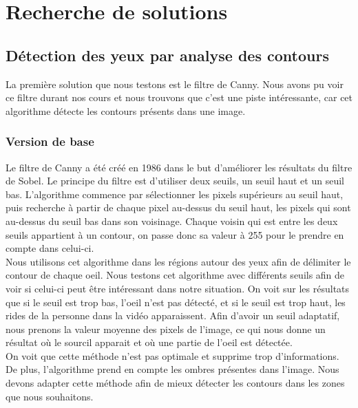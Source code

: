 \section{Recherche de solutions}

\subsection{Détection des yeux par analyse des contours}
La première solution que nous testons est le filtre de Canny. Nous avons pu voir ce filtre durant
nos cours et nous trouvons que c'est une piste intéressante, car cet algorithme détecte les contours
présents dans une image.

\subsubsection{Version de base}
Le filtre de Canny a été créé en 1986 dans le but d'améliorer les résultats du filtre de Sobel.
Le principe du filtre est d'utiliser deux seuils, un seuil haut et un seuil bas. L'algorithme
commence par sélectionner les pixels supérieurs au seuil haut, puis recherche à partir de chaque
pixel au-dessus du seuil haut, les pixels qui sont au-dessus du seuil bas dans son voisinage. 
Chaque voisin qui est entre les deux seuils appartient à un contour, on passe donc sa valeur à
255 pour le prendre en compte dans celui-ci.\\ 

Nous utilisons cet algorithme dans les régions autour des yeux afin de délimiter le contour
de chaque oeil. Nous testons cet algorithme avec différents seuils afin de voir si celui-ci
peut être intéressant dans notre situation. On voit sur les résultats que si le seuil est trop
bas, l'oeil n'est pas détecté, et si le seuil est trop haut, les rides de la personne dans la vidéo
apparaissent. Afin d'avoir un seuil adaptatif, nous prenons la valeur moyenne des pixels de l'image, ce
qui nous donne un résultat où le sourcil apparait et où une partie de l'oeil est détectée.\\


On voit que cette méthode n'est pas optimale et supprime trop d'informations. De plus,
l'algorithme prend en compte les ombres présentes dans l'image. Nous devons adapter cette méthode
afin de mieux détecter les contours dans les zones que nous souhaitons.

